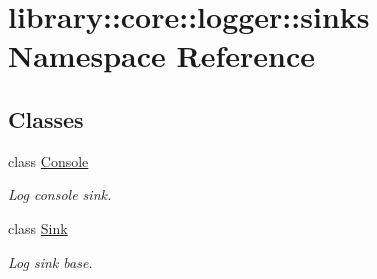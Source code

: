 \hypertarget{namespacelibrary_1_1core_1_1logger_1_1sinks}{}\section{library\+:\+:core\+:\+:logger\+:\+:sinks Namespace Reference}
\label{namespacelibrary_1_1core_1_1logger_1_1sinks}
\subsection*{Classes}
\begin{DoxyCompactItemize}
\item 
class \hyperlink{classlibrary_1_1core_1_1logger_1_1sinks_1_1_console}{Console}
\begin{DoxyCompactList}\small\item\em Log console sink. \end{DoxyCompactList}\item 
class \hyperlink{classlibrary_1_1core_1_1logger_1_1sinks_1_1_sink}{Sink}
\begin{DoxyCompactList}\small\item\em Log sink base. \end{DoxyCompactList}\end{DoxyCompactItemize}
